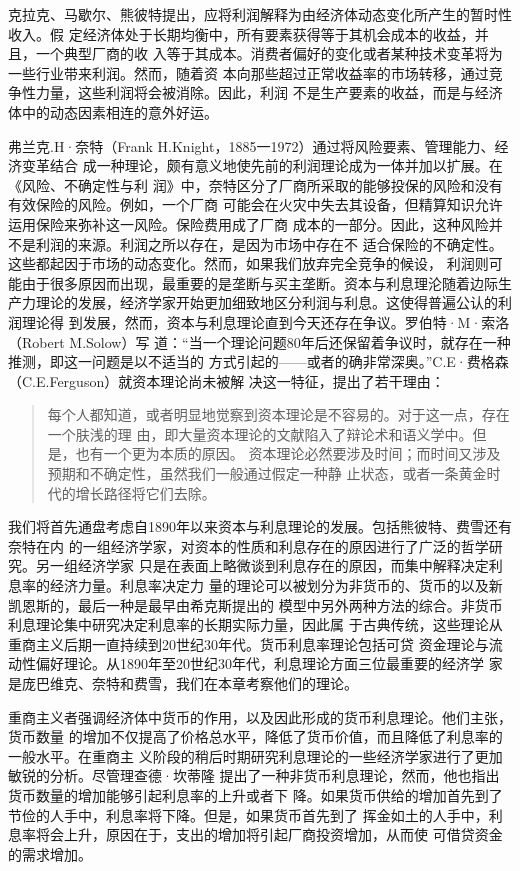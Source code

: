 克拉克、马歇尔、熊彼特提出，应将利润解释为由经济体动态变化所产生的暂时性收入。假
定经济体处于长期均衡中，所有要素获得等于其机会成本的收益，并且，一个典型厂商的收
入等于其成本。消费者偏好的变化或者某种技术变革将为一些行业带来利润。然而，随着资
本向那些超过正常收益率的市场转移，通过竞争性力量，这些利润将会被消除。因此，利润
不是生产要素的收益，而是与经济体中的动态因素相连的意外好运。

弗兰克.H·奈特（Frank H.Knight，1885一1972）通过将风险要素、管理能力、经济变革结合
成一种理论，颇有意义地使先前的利润理论成为一体并加以扩展。在《风险、不确定性与利
润》中，奈特区分了厂商所采取的能够投保的风险和没有有效保险的风险。例如，一个厂商
可能会在火灾中失去其设备，但精算知识允许运用保险来弥补这一风险。保险费用成了厂商
成本的一部分。因此，这种风险并不是利润的来源。利润之所以存在，是因为市场中存在不
适合保险的不确定性。这些都起因于市场的动态变化。然而，如果我们放弃完全竞争的候设，
利润则可能由于很多原因而出现，最重要的是垄断与买主垄断。资本与利息理沦随着边际生
产力理论的发展，经济学家开始更加细致地区分利润与利息。这使得普遍公认的利润理论得
到发展，然而，资本与利息理论直到今天还存在争议。罗伯特·M·索洛（Robert M.Solow）写
道：“当一个理论问题80年后还保留着争议时，就存在一种推测，即这一问题是以不适当的
方式引起的——或者的确非常深奥。”C.E·费格森（C.E.Ferguson）就资本理论尚未被解
决这一特征，提出了若干理由：
\begin{quotation}
  每个人都知道，或者明显地觉察到资本理论是不容易的。对于这一点，存在一个肤浅的理
  由，即大量资本理论的文献陷入了辩论术和语义学中。但是，也有一个更为本质的原因。
  资本理论必然要涉及时间；而时间又涉及预期和不确定性，虽然我们一般通过假定一种静
  止状态，或者一条黄金时代的增长路径将它们去除。
\end{quotation}

我们将首先通盘考虑自1890年以来资本与利息理论的发展。包括熊彼特、费雪还有奈特在内
的一组经济学家，对资本的性质和利息存在的原因进行了广泛的哲学研究。另一组经济学家
只是在表面上略微谈到利息存在的原因，而集中解释决定利息率的经济力量。利息率决定力
量的理论可以被划分为非货币的、货币的以及新凯恩斯的，最后一种是最早由希克斯提出的
模型中另外两种方法的综合。非货币利息理论集中研究决定利息率的长期实际力量，因此属
于古典传统，这些理论从重商主义后期一直持续到20世纪30年代。货币利息率理论包括可贷
资金理论与流动性偏好理论。从1890年至20世纪30年代，利息理论方面三位最重要的经济学
家是庞巴维克、奈特和费雪，我们在本章考察他们的理论。

重商主义者强调经济体中货币的作用，以及因此形成的货币利息理论。他们主张，货币数量
的增加不仅提高了价格总水平，降低了货币价值，而且降低了利息率的一般水平。在重商主
义阶段的稍后时期研究利息理论的一些经济学家进行了更加敏锐的分析。尽管理查德·坎蒂隆
提出了一种非货币利息理论，然而，他也指出货币数量的增加能够引起利息率的上升或者下
降。如果货币供给的增加首先到了节俭的人手中，利息率将下降。但是，如果货币首先到了
挥金如土的人手中，利息率将会上升，原因在于，支出的增加将引起厂商投资增加，从而使
可借贷资金的需求增加。

